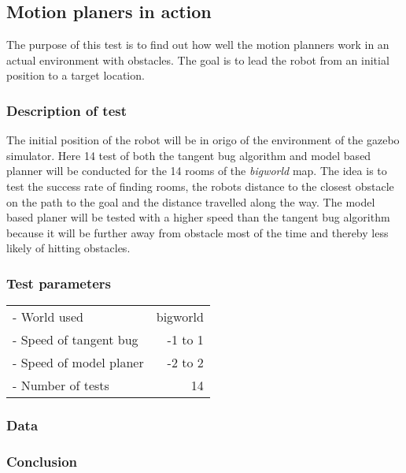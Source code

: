 \documentclass[../Head/Main.tex]{subfiles}
\begin{document}
\subsection{Motion planers in action}

The purpose of this test is to find out how well the motion planners work in an actual environment with obstacles. The goal is to lead the robot from an initial position to a target location. 

\subsubsection{Description of test}

The initial position of the robot will be in origo of the environment of the gazebo simulator. Here 14 test of both the tangent bug algorithm and model based planner will be conducted for the 14 rooms of the \textit{bigworld} map. The idea is to test the success rate of finding rooms, the robots distance to the closest obstacle on the path to the goal and the distance travelled along the way. The model based planer will be tested with a higher speed than the tangent bug algorithm because it will be further away from obstacle most of the time and thereby less likely of hitting obstacles.           

\subsubsection{Test parameters}

\begin{tabular}{l r}
	- World used                & bigworld\\	
	- Speed of tangent bug      & -1 to 1\\
	- Speed of model planer     & -2 to 2\\
	- Number of tests           & 14
\end{tabular}

\subsubsection{Data}




\subsubsection{Conclusion}
\end{document}
